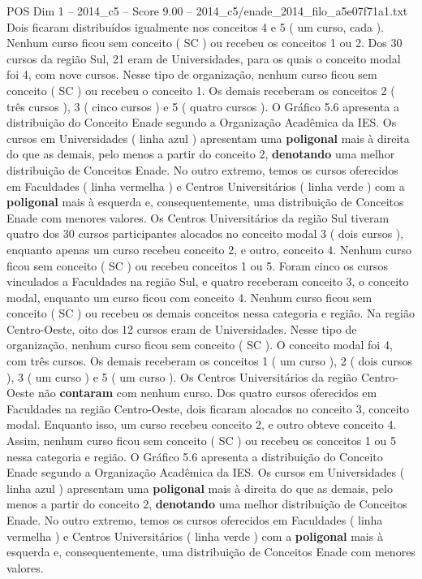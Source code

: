 \begin{textsample}{POS Dim 1 – 2014\_c5 – Score 9.00 – 2014\_c5/enade\_2014\_filo\_a5e07f71a1.txt}
Dois ficaram distribuídos igualmente nos conceitos 4 e 5 ( um curso, cada ).
Nenhum curso ficou sem conceito ( SC ) ou recebeu os conceitos 1 ou 2.
Dos 30 cursos da região Sul, 21 eram de Universidades, para os quais o conceito modal foi 4, com nove cursos.
Nesse tipo de organização, nenhum curso ficou sem conceito ( SC ) ou recebeu o conceito 1.
Os demais receberam os conceitos 2 ( três cursos ), 3 ( cinco cursos ) e 5 ( quatro cursos ).
O Gráfico 5.6 apresenta a distribuição do Conceito Enade segundo a Organização Acadêmica da IES.
Os cursos em Universidades ( linha azul ) apresentam uma \textbf{poligonal} mais à direita do que as demais, pelo menos a partir do conceito 2, \textbf{denotando} uma melhor distribuição de Conceitos Enade.
No outro extremo, temos os cursos oferecidos em Faculdades ( linha vermelha ) e Centros Universitários ( linha verde ) com a \textbf{poligonal} mais à esquerda e, consequentemente, uma distribuição de Conceitos Enade com menores valores.
Os Centros Universitários da região Sul tiveram quatro dos 30 cursos participantes alocados no conceito modal 3 ( dois cursos ), enquanto apenas um curso recebeu conceito 2, e outro, conceito 4.
Nenhum curso ficou sem conceito ( SC ) ou recebeu conceitos 1 ou 5.
Foram cinco os cursos vinculados a Faculdades na região Sul, e quatro receberam conceito 3, o conceito modal, enquanto um curso ficou com conceito 4.
Nenhum curso ficou sem conceito ( SC ) ou recebeu os demais conceitos nessa categoria e região.
Na região Centro-Oeste, oito dos 12 cursos eram de Universidades.
Nesse tipo de organização, nenhum curso ficou sem conceito ( SC ).
O conceito modal foi 4, com três cursos.
Os demais receberam os conceitos 1 ( um curso ), 2 ( dois cursos ), 3 ( um curso ) e 5 ( um curso ).
Os Centros Universitários da região Centro-Oeste não \textbf{contaram} com nenhum curso.
Dos quatro cursos oferecidos em Faculdades na região Centro-Oeste, dois ficaram alocados no conceito 3, conceito modal.
Enquanto isso, um curso recebeu conceito 2, e outro obteve conceito 4.
Assim, nenhum curso ficou sem conceito ( SC ) ou recebeu os conceitos 1 ou 5 nessa categoria e região.
O Gráfico 5.6 apresenta a distribuição do Conceito Enade segundo a Organização Acadêmica da IES.
Os cursos em Universidades ( linha azul ) apresentam uma \textbf{poligonal} mais à direita do que as demais, pelo menos a partir do conceito 2, \textbf{denotando} uma melhor distribuição de Conceitos Enade.
No outro extremo, temos os cursos oferecidos em Faculdades ( linha vermelha ) e Centros Universitários ( linha verde ) com a \textbf{poligonal} mais à esquerda e, consequentemente, uma distribuição de Conceitos Enade com menores valores.

\end{textsample}
